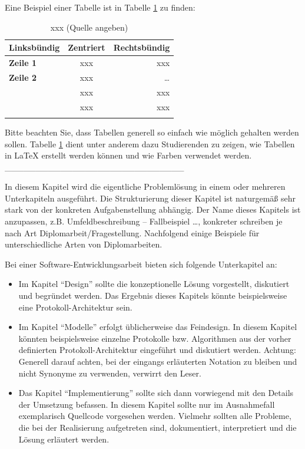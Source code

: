 Eine Beispiel einer Tabelle ist in Tabelle \ref{tab:xxx} zu finden:
\begin{table}
	\centering
	\begin{tabular}{| >{\bfseries}l | c | r | }
		\hline
			\rowcolor{orange} \bfseries Linksbündig & \bfseries Zentriert & \bfseries Rechtsbündig \\
		\hline
		\hline
			Zeile 1 & xxx & xxx \\\hline
			Zeile 2 & xxx & \dots \\\hline
			\multirow{2}{*}{Zeile3}
			& xxx & xxx \\\cline{2-3}
			& xxx & xxx \\\hline
		\hline
			\multicolumn{3}{| c |}{xxx} \\\hline
	\end{tabular}
	\caption{xxx (Quelle angeben)}
	\label{tab:xxx}
\end{table}

Bitte beachten Sie, dass Tabellen generell so einfach wie möglich gehalten werden sollen. Tabelle \ref{tab:xxx} dient unter anderem dazu Studierenden zu zeigen, wie Tabellen in \LaTeX\xspace erstellt werden können und wie Farben verwendet werden.
_____________________________


In diesem Kapitel wird die eigentliche Problemlösung in einem oder mehreren Unterkapiteln ausgeführt. Die Strukturierung dieser Kapitel ist naturgemäß sehr stark von der konkreten Aufgabenstellung abhängig. Der Name dieses Kapitels ist anzupassen, z.B. Umfeldbeschreibung -- Fallbeispiel \dots, konkreter schreiben je nach Art Diplomarbeit/Fragestellung.
\makeatletter\ifthesis@masterthesis
Nachfolgend einige Beispiele für unterschiedliche Arten von Diplomarbeiten.

Bei einer Software-Entwicklungsarbeit bieten sich folgende Unterkapitel an:
\begin{itemize}
	\item Im Kapitel \enquote{Design} sollte die konzeptionelle Lösung vorgestellt, diskutiert und begründet werden. Das Ergebnis dieses Kapitels könnte beispielsweise eine Protokoll-Architektur sein.
	\item Im Kapitel \enquote{Modelle} erfolgt üblicherweise das Feindesign. In diesem Kapitel könnten beispielsweise einzelne Protokolle bzw. Algorithmen aus der vorher definierten Protokoll-Architektur eingeführt und diskutiert werden. Achtung: Generell darauf achten, bei der eingangs erläuterten Notation zu bleiben und nicht Synonyme zu verwenden, verwirrt den Leser.
	\item Das Kapitel \enquote{Implementierung} sollte sich dann vorwiegend mit den Details der Umsetzung befassen. In diesem Kapitel sollte nur im Ausnahmefall exemplarisch Quellcode vorgesehen werden. Vielmehr sollten alle Probleme, die bei der Realisierung aufgetreten sind, dokumentiert, interpretiert und die Lösung erläutert werden.
\end{itemize}

